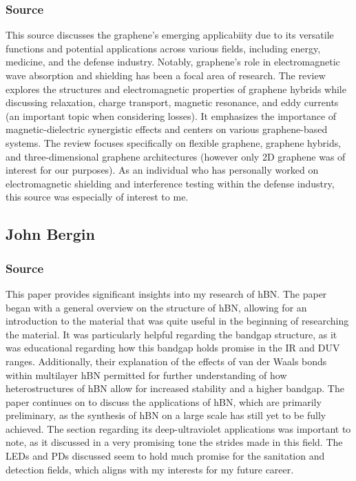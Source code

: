 \documentclass[conference]{IEEEtran}
\begin{document}
\subsubsection{Source \cite{mb5}}

This source discusses the graphene's emerging applicabiity due to its versatile functions and potential applications across various fields, including energy, medicine, and the defense industry. Notably, graphene's role in electromagnetic wave absorption and shielding has been a focal area of research. The review explores the structures and electromagnetic properties of graphene hybrids while discussing relaxation, charge transport, magnetic resonance, and eddy currents (an important topic when considering losses). It emphasizes the importance of magnetic-dielectric synergistic effects and centers on various graphene-based systems. The review focuses specifically on flexible graphene, graphene hybrids, and three-dimensional graphene architectures (however only 2D graphene was of interest for our purposes). As an individual who has personally worked on electromagnetic shielding and interference testing within the defense industry, this source was especially of interest to me.

\subsection{John Bergin}

\subsubsection{Source \cite{jb1}}

This paper provides significant insights into my research of hBN. The paper began with a general overview on the structure of hBN, allowing for an introduction to the material that was quite useful in the beginning of researching the material. It was particularly helpful regarding the bandgap structure, as it was educational regarding how this bandgap holds promise in the IR and DUV ranges. Additionally, their explanation of the effects of van der Waals bonds within multilayer hBN permitted for further understanding of how heterostructures of hBN allow for increased stability and a higher bandgap. The paper continues on to discuss the applications of hBN, which are primarily preliminary, as the synthesis of hBN on a large scale has still yet to be fully achieved. The section regarding its deep-ultraviolet applications was important to note, as it discussed in a very promising tone the strides made in this field. The LEDs and PDs discussed seem to hold much promise for the sanitation and detection fields, which aligns with my interests for my future career.
\end{document}
